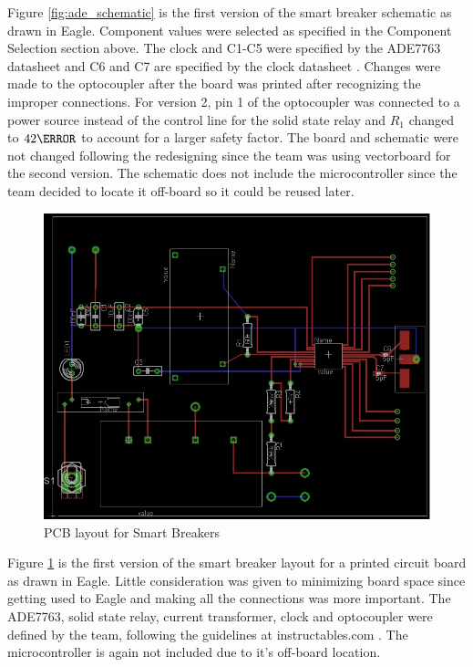 Figure \ref{fig:ade_schematic} is the first version of the smart breaker schematic as drawn in Eagle. Component values were selected as specified in the Component Selection section above. The clock and C1-C5 were specified by the ADE7763 datasheet \cite{ADE7763} and C6 and C7 are specified by the clock datasheet \cite{nateClock}. Changes were made to the optocoupler after the board was printed after recognizing the improper connections. For version 2, pin 1 of the optocoupler was connected to a power source instead of the control line for the solid state relay and $R_{1}$ changed to $42 \ohm$ to account for a larger safety factor. The board and schematic were not changed following the redesigning since the team was using vectorboard for the second version. The schematic does not include the microcontroller since the team decided to locate it off-board so it could be reused later. 

\begin{figure}[htbp]
\begin{center}
\includegraphics[width=\textwidth]{includes/NJADELayout} 
\caption{PCB layout for Smart Breakers}
\label{fig:ade_layout}   
\end{center}
\end{figure}

Figure \ref{fig:ade_layout} is the first version of the smart breaker layout for a printed circuit board as drawn in Eagle. Little consideration was given to minimizing board space since getting used to Eagle and making all the connections was more important. The ADE7763, solid state relay, current transformer, clock and optocoupler were defined by the team, following the guidelines at instructables.com \cite{instructables}. The microcontroller is again not included due to it's off-board location. 

